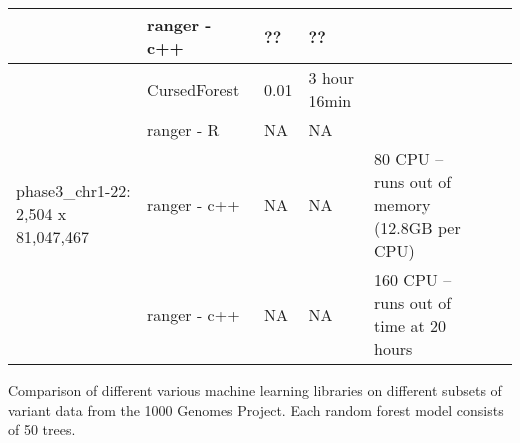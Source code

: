 \documentclass[11pt]{article}
\newcommand{\cursedforest}{{\sc CursedForest}}
\begin{document}
\begin{sidewaystable}[!ht]
\begin{minipage}{\textwidth}
\begin{tabular}{|l|l|l|l|l|l|p{1cm}|}
						& ranger - c++ & ?? & ?? &  \\
\hline
\multirow{4}{*}{phase3\_chr1-22: 2,504 x 81,047,467} & \cursedforest\ & 0.01  & 3 hour 16min & \\%
										& ranger - R       &        NA     &        NA   & \\
										& ranger - c++       &        NA     &        NA     &            80 CPU -- runs out of memory (12.8GB per CPU) \\
										& ranger - c++       &        NA     &        NA     &            160 CPU -- runs out of time at 20 hours \\
\hline
\end{tabular}
\begin{flushleft} 
Comparison of different various machine learning libraries on different subsets of variant data 
from the 1000 Genomes Project.
Each random forest model consists of 50 trees.
\end{flushleft}
\label{table1}
\end{minipage}
\end{sidewaystable}








%

\end{document}
